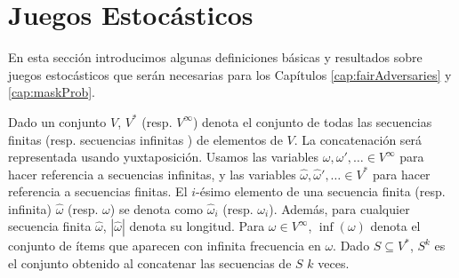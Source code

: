 \section{Juegos Estocásticos}

En esta sección introducimos algunas definiciones básicas y resultados sobre juegos estocásticos que serán necesarias para los Capítulos \ref{cap:fairAdversaries} y \ref{cap:maskProb}.


Dado un conjunto $V$, $V^*$ (resp. $V^\infty$) denota el conjunto de todas las secuencias finitas (resp. secuencias infinitas ) de elementos de $V$. La concatenación será representada usando yuxtaposición. Usamos las variables $\omega, \omega', \dots \in V^\infty$ para hacer referencia a secuencias infinitas, y las variables $\hat{\omega}, \hat{\omega}', \dots \in V^*$ para hacer referencia a secuencias finitas. El $i$-ésimo elemento de una secuencia finita (resp. infinita) $\hat{\omega}$ (resp. $\omega$) se denota como
$\hat{\omega}_i$ (resp. $\omega_i$). Además, para cualquier secuencia finita $\hat{\omega}$, $|\hat{\omega}|$ denota su longitud. Para $\omega \in V^\infty$, $\inf(\omega)$ denota el conjunto de ítems que aparecen con infinita frecuencia en $\omega$. Dado
$S \subseteq V^*$, $S^k$ es el conjunto obtenido al concatenar las secuencias de $S$ $k$ veces.
	 
